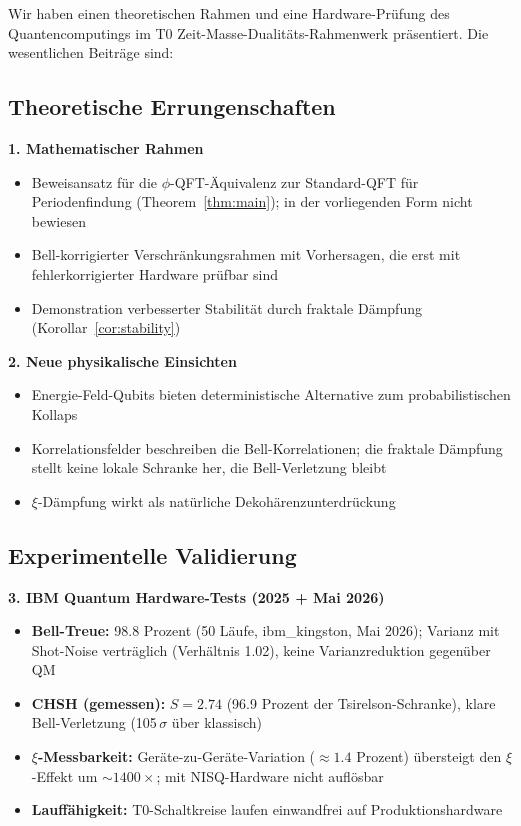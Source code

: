 Wir haben einen theoretischen Rahmen und eine Hardware-Prüfung des Quantencomputings im T0 Zeit-Masse-Dualitäts-Rahmenwerk präsentiert. Die wesentlichen Beiträge sind:

\subsection{Theoretische Errungenschaften}

\textbf{1. Mathematischer Rahmen}
\begin{itemize}
	\item Beweisansatz für die $\phi$-QFT-Äquivalenz zur Standard-QFT für Periodenfindung (Theorem~\ref{thm:main}); in der vorliegenden Form nicht bewiesen
	\item Bell-korrigierter Verschränkungsrahmen mit Vorhersagen, die erst mit fehlerkorrigierter Hardware prüfbar sind
	\item Demonstration verbesserter Stabilität durch fraktale Dämpfung (Korollar~\ref{cor:stability})
\end{itemize}

\textbf{2. Neue physikalische Einsichten}
\begin{itemize}
	\item Energie-Feld-Qubits bieten deterministische Alternative zum probabilistischen Kollaps
	\item Korrelationsfelder beschreiben die Bell-Korrelationen; die fraktale Dämpfung stellt keine lokale Schranke her, die Bell-Verletzung bleibt
	\item $\xi$-Dämpfung wirkt als natürliche Dekohärenzunterdrückung
\end{itemize}

\subsection{Experimentelle Validierung}

\textbf{3. IBM Quantum Hardware-Tests (2025 + Mai 2026)}
\begin{itemize}
	\item \textbf{Bell-Treue:} 98.8 Prozent (50 Läufe, ibm\_kingston, Mai 2026); Varianz mit Shot-Noise verträglich (Verhältnis 1.02), keine Varianzreduktion gegenüber QM
	\item \textbf{CHSH (gemessen):} $S = 2.74$ (96.9 Prozent der Tsirelson-Schranke), klare Bell-Verletzung (105\,$\sigma$ über klassisch)
	\item \textbf{$\xi$-Messbarkeit:} Geräte-zu-Geräte-Variation ($\approx 1.4$ Prozent) übersteigt den $\xi$-Effekt um $\sim 1400\times$; mit NISQ-Hardware nicht auflösbar
	\item \textbf{Lauffähigkeit:} T0-Schaltkreise laufen einwandfrei auf Produktionshardware
\end{itemize}

